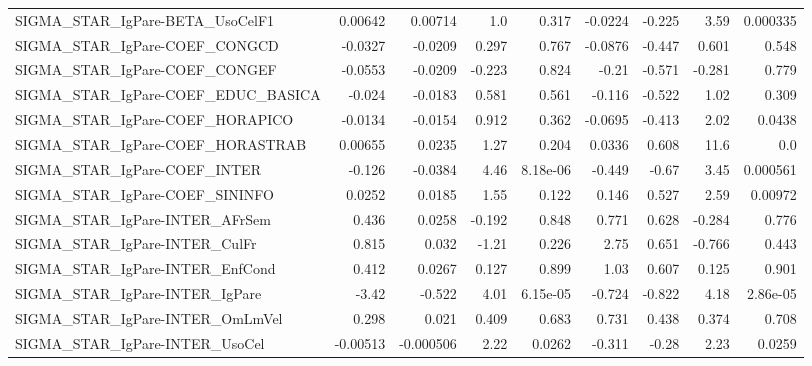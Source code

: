 \begin{tabular}{lrrrrrrrr}
SIGMA\_STAR\_IgPare-BETA\_UsoCelF1       &     0.00642 &      0.00714 &     1.0 &    0.317 &    -0.0224 &      -0.225 &         3.59 &      0.000335 \\
SIGMA\_STAR\_IgPare-COEF\_CONGCD         &     -0.0327 &      -0.0209 &   0.297 &    0.767 &    -0.0876 &      -0.447 &        0.601 &         0.548 \\
SIGMA\_STAR\_IgPare-COEF\_CONGEF         &     -0.0553 &      -0.0209 &  -0.223 &    0.824 &      -0.21 &      -0.571 &       -0.281 &         0.779 \\
SIGMA\_STAR\_IgPare-COEF\_EDUC\_BASICA    &      -0.024 &      -0.0183 &   0.581 &    0.561 &     -0.116 &      -0.522 &         1.02 &         0.309 \\
SIGMA\_STAR\_IgPare-COEF\_HORAPICO       &     -0.0134 &      -0.0154 &   0.912 &    0.362 &    -0.0695 &      -0.413 &         2.02 &        0.0438 \\
SIGMA\_STAR\_IgPare-COEF\_HORASTRAB      &     0.00655 &       0.0235 &    1.27 &    0.204 &     0.0336 &       0.608 &         11.6 &           0.0 \\
SIGMA\_STAR\_IgPare-COEF\_INTER          &      -0.126 &      -0.0384 &    4.46 & 8.18e-06 &     -0.449 &       -0.67 &         3.45 &      0.000561 \\
SIGMA\_STAR\_IgPare-COEF\_SININFO        &      0.0252 &       0.0185 &    1.55 &    0.122 &      0.146 &       0.527 &         2.59 &       0.00972 \\
SIGMA\_STAR\_IgPare-INTER\_AFrSem        &       0.436 &       0.0258 &  -0.192 &    0.848 &      0.771 &       0.628 &       -0.284 &         0.776 \\
SIGMA\_STAR\_IgPare-INTER\_CulFr         &       0.815 &        0.032 &   -1.21 &    0.226 &       2.75 &       0.651 &       -0.766 &         0.443 \\
SIGMA\_STAR\_IgPare-INTER\_EnfCond       &       0.412 &       0.0267 &   0.127 &    0.899 &       1.03 &       0.607 &        0.125 &         0.901 \\
SIGMA\_STAR\_IgPare-INTER\_IgPare        &       -3.42 &       -0.522 &    4.01 & 6.15e-05 &     -0.724 &      -0.822 &         4.18 &      2.86e-05 \\
SIGMA\_STAR\_IgPare-INTER\_OmLmVel       &       0.298 &        0.021 &   0.409 &    0.683 &      0.731 &       0.438 &        0.374 &         0.708 \\
SIGMA\_STAR\_IgPare-INTER\_UsoCel        &    -0.00513 &    -0.000506 &    2.22 &   0.0262 &     -0.311 &       -0.28 &         2.23 &        0.0259 \\

\end{tabular}
